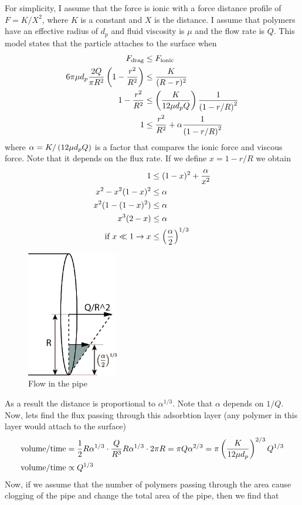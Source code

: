 For simplicity, I assume that the force is ionic with a force distance
profile of $F= K/X^2$, where $K$ is a constant and $X$ is the
distance. I assume that polymers have an effective radius of $d_{p}$
and fluid viscosity is $\mu$ and the flow rate is $Q$. This model
states that the particle attaches to the surface when
\begin{align}
    F_{\text{drag}} &\leq F_{\text{ionic}}\\
    6\pi \mu d_{p} \frac{2Q}{\pi R^2} \left( 1- \frac{r^2}{R^2} \right) & \leq \frac{K}{(R-r)^2} \\
    1 - \frac{r^2}{R^2} & \leq \left( \frac{K }{12 \mu  d_{p} Q} \right) \frac{1}{\left( 1 - r/R \right)^2} \\
    1 & \leq \frac{r^2}{R^2} + \alpha \frac{1}{\left( 1-r/R\right) ^2}
\end{align}
%
where $\alpha = K/\left( 12\mu d_pQ \right)$ is a factor that compares the ionic force and viscous
force. Note that it depends on the flux rate. If we define
$x = 1- r/R$ we obtain
%
\begin{align}
    1 &\leq (1-x)^{2} + \frac{\alpha}{x^2} \\
    x^2- x^2(1-x)^{2} &\leq \alpha \\
    x^2 (1- (1-x)^2) & \leq \alpha \\
    x^3(2-x) & \leq \alpha \\
    \text{if } x\ll1 \to x & \leq \left( \frac{\alpha}{2}\right)^{1/3}
\end{align}
%
%
\begin{figure}[h]
  \centering
  \includegraphics[width=4cm]{./Figs/model2.jpg}
  \caption{Flow in the pipe}
\end{figure}
%
As a result the distance is proportional to $\alpha^{1/3}$. Note that
$\alpha$ depends on $1/Q$.  Now, lets
find the flux passing through this adsorbtion layer (any polymer in
this layer would attach to the surface)
%
%
\begin{align}
  \text{volume}/\text{time} &= \frac{1}{2} R \alpha ^{1/3} \cdot \frac{Q}{R^{3}} R\alpha^{1/3} \cdot 2\pi R = \pi Q \alpha^{2/3}  = \pi \left( \frac{K  }{12 \mu  d_{p}} \right)^{2/3} Q^{1/3} \\
  \text{volume}/\text{time} & \propto {Q^{1/3}} 
\end{align}
%
Now, if we assume that the number of polymers passing through the area
cause clogging of the pipe and change the total area of the pipe, then
we find that


